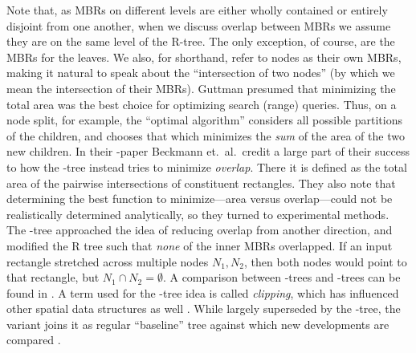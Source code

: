 Note that, as MBRs on different levels are either wholly contained or entirely disjoint from one another, when we discuss overlap between MBRs we assume they are on the same level of the R-tree.
The only exception, of course, are the MBRs for the leaves.
We also, for shorthand, refer to nodes as their own MBRs, making it natural to speak about the ``intersection of two nodes'' (by which we mean the intersection of their MBRs).
Guttman \cite{guttman84} presumed that minimizing the total area was the best choice for optimizing search (range) queries.
Thus, on a node split, for example, the ``optimal algorithm'' considers all possible partitions of the children, and chooses that which minimizes the \emph{sum} of the area of the two new children.
In their \rstar-paper \cite{beckmannkriegelschneiderseeger90} Beckmann et.\ al.\ credit a large part of their success to how the \rstar-tree instead tries to minimize \emph{overlap}.
There it is defined as the total area of the pairwise intersections of constituent rectangles.
They also note that determining the best function to minimize---area versus overlap---could not be realistically determined analytically, so they turned to experimental methods.
The \rplus-tree \cite{sellisroussopoulosfaloutsos87} approached the idea of reducing overlap from another direction, and modified the R tree such that \emph{none} of the inner MBRs overlapped.
If an input rectangle stretched across multiple nodes $N_1,N_2$, then both nodes would point to that rectangle, but $N_1\cap N_2=\emptyset$.
A comparison between \rbase-trees and \rplus-trees can be found in \cite{greene89}.
A term used for the \rplus-tree idea is called \emph{clipping}, which has influenced other spatial data structures as well \cite{gaedegunther98}.
While largely superseded by the \rstar-tree, the \rplus variant joins it as regular ``baseline'' tree against which new developments are compared \cite{thebook}.

